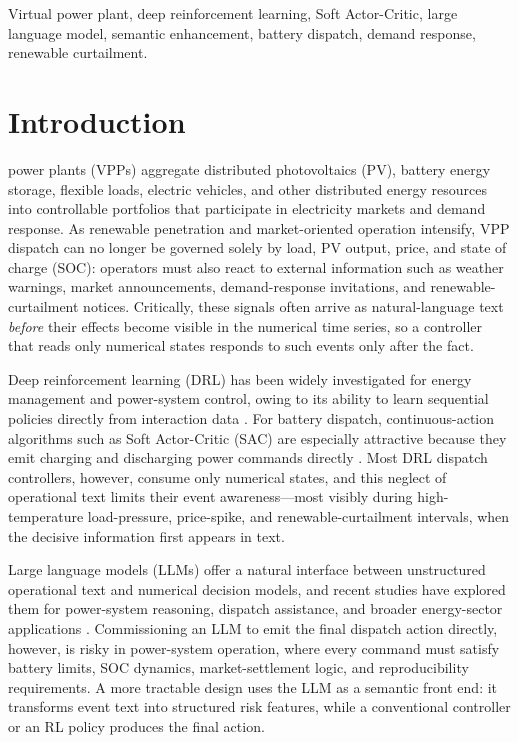 \documentclass{ieeeaccess}
\begin{document}
\begin{keywords}
Virtual power plant, deep reinforcement learning, Soft Actor-Critic, large language model, semantic enhancement, battery dispatch, demand response, renewable curtailment.
\end{keywords}

\titlepgskip=-15pt
\maketitle

\section{Introduction}
\label{sec:introduction}
 power plants (VPPs) aggregate distributed photovoltaics (PV), battery energy storage, flexible loads, electric vehicles, and other distributed energy resources into controllable portfolios that participate in electricity markets and demand response. As renewable penetration and market-oriented operation intensify, VPP dispatch can no longer be governed solely by load, PV output, price, and state of charge (SOC): operators must also react to external information such as weather warnings, market announcements, demand-response invitations, and renewable-curtailment notices. Critically, these signals often arrive as natural-language text \emph{before} their effects become visible in the numerical time series, so a controller that reads only numerical states responds to such events only after the fact.

Deep reinforcement learning (DRL) has been widely investigated for energy management and power-system control, owing to its ability to learn sequential policies directly from interaction data \cite{b1,b2,b9}. For battery dispatch, continuous-action algorithms such as Soft Actor-Critic (SAC) are especially attractive because they emit charging and discharging power commands directly \cite{b3,b11,b12}. Most DRL dispatch controllers, however, consume only numerical states, and this neglect of operational text limits their event awareness---most visibly during high-temperature load-pressure, price-spike, and renewable-curtailment intervals, when the decisive information first appears in text.

Large language models (LLMs) offer a natural interface between unstructured operational text and numerical decision models, and recent studies have explored them for power-system reasoning, dispatch assistance, and broader energy-sector applications \cite{b4,b5,b6}. Commissioning an LLM to emit the final dispatch action directly, however, is risky in power-system operation, where every command must satisfy battery limits, SOC dynamics, market-settlement logic, and reproducibility requirements. A more tractable design uses the LLM as a semantic front end: it transforms event text into structured risk features, while a conventional controller or an RL policy produces the final action.
\end{document}
